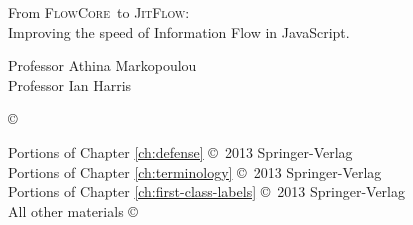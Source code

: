 \documentclass[12pt,fleqn]{ucithesis}
\newcommand{\FlowCore}[0]{\textsc{FlowCore}}
\newcommand{\JitFlow}[0]{\textsc{JitFlow}}
\begin{document}
\thesistitle
{
        From \FlowCore\ to \JitFlow:\\
        Improving the speed of Information Flow in JavaScript.
}




\othercommitteemembers
{
	Professor Athina Markopoulou\\
	Professor Ian Harris
}


\copyrightdeclaration
{
	{\copyright} {\Degreeyear} \Authorname
}

\prepublishedcopyrightdeclaration
{
  Portions of Chapter \autoref{ch:defense} \copyright\ 2013 Springer-Verlag\\ %
  Portions of Chapter \autoref{ch:terminology} \copyright\ 2013 Springer-Verlag\\ %
  Portions of Chapter \autoref{ch:first-class-labels} \copyright\ 2013 Springer-Verlag\\ %
  All other materials \copyright\ \Degreeyear\ \Authorname
}

\end{document}
